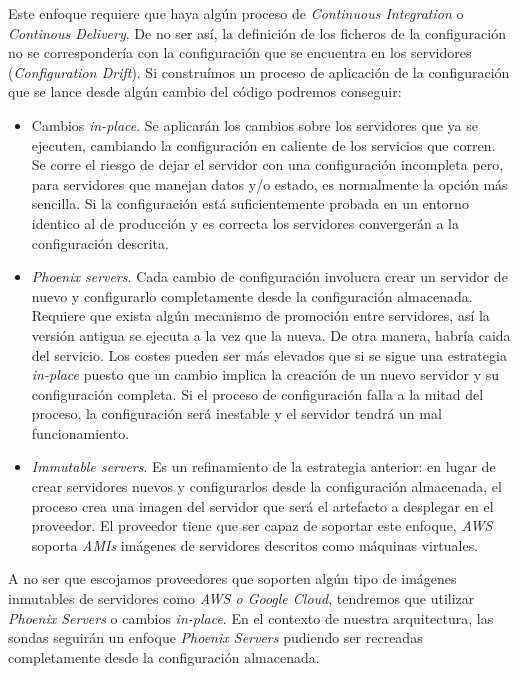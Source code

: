 Este enfoque requiere que haya algún proceso de \emph{Continuous Integration} o \emph{Continous Delivery}. De no ser así, la definición de los ficheros
de la configuración no se correspondería con la configuración que se encuentra en los servidores (\emph{Configuration Drift}). Si construímos 
un proceso de aplicación de la configuración que se lance desde algún cambio del código podremos conseguir:

\begin{itemize}
    \item Cambios \emph{in-place}. Se aplicarán los cambios sobre los servidores que ya se ejecuten, cambiando la configuración en caliente de los servicios que corren.
    Se corre el riesgo de dejar el servidor con una configuración incompleta pero, para servidores que manejan datos y/o estado, es normalmente la opción más sencilla. Si la configuración
    está suficientemente probada en un entorno identico al de producción y es correcta los servidores convergerán a la configuración descrita. 
    \item \emph{Phoenix servers}. Cada cambio de configuración involucra crear un servidor de nuevo y configurarlo completamente desde la configuración almacenada.
    Requiere que exista algún mecanismo de promoción entre servidores, así la versión antigua se ejecuta a la vez que la nueva. De otra manera, habría caida del servicio. Los costes pueden ser más elevados que si se sigue una estrategia \emph{in-place}
    puesto que un cambio implica la creación de un nuevo servidor y su configuración completa. Si el proceso de configuración falla a la mitad del proceso, la configuración será inestable y el servidor tendrá un mal funcionamiento.
    \item \emph{Immutable servers}. Es un refinamiento de la estrategia anterior: en lugar de crear servidores nuevos y configurarlos desde la configuración almacenada, el proceso crea una imagen del servidor que será el artefacto a desplegar en el proveedor.
    El proveedor tiene que ser capaz de soportar este enfoque, \emph{AWS} soporta \emph{AMIs} imágenes de servidores descritos como máquinas virtuales.  
\end{itemize}

A no ser que escojamos proveedores que soporten algún tipo de imágenes inmutables de servidores como \emph{AWS o Google Cloud}, tendremos que utilizar \emph{Phoenix Servers} o cambios \emph{in-place}.
En el contexto de nuestra arquitectura, las sondas seguirán un enfoque \emph{Phoenix Servers} pudiendo ser recreadas completamente desde la configuración almacenada.

